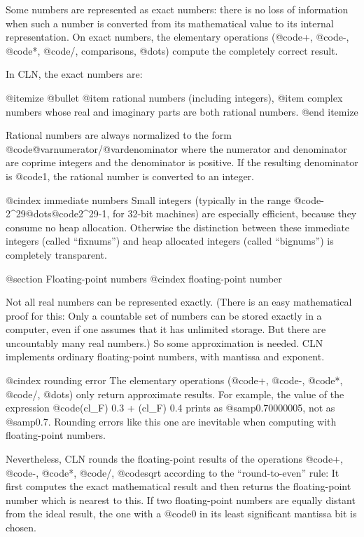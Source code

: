 Some numbers are represented as exact numbers: there is no loss of information
when such a number is converted from its mathematical value to its internal
representation. On exact numbers, the elementary operations (@code{+},
@code{-}, @code{*}, @code{/}, comparisons, @dots{}) compute the completely
correct result.

In CLN, the exact numbers are:

@itemize @bullet
@item
rational numbers (including integers),
@item
complex numbers whose real and imaginary parts are both rational numbers.
@end itemize

Rational numbers are always normalized to the form
@code{@var{numerator}/@var{denominator}} where the numerator and denominator
are coprime integers and the denominator is positive. If the resulting
denominator is @code{1}, the rational number is converted to an integer.

@cindex immediate numbers
Small integers (typically in the range @code{-2^29}@dots{}@code{2^29-1},
for 32-bit machines) are especially efficient, because they consume no heap
allocation. Otherwise the distinction between these immediate integers
(called ``fixnums'') and heap allocated integers (called ``bignums'')
is completely transparent.


@section Floating-point numbers
@cindex floating-point number

Not all real numbers can be represented exactly. (There is an easy mathematical
proof for this: Only a countable set of numbers can be stored exactly in
a computer, even if one assumes that it has unlimited storage. But there
are uncountably many real numbers.) So some approximation is needed.
CLN implements ordinary floating-point numbers, with mantissa and exponent.

@cindex rounding error
The elementary operations (@code{+}, @code{-}, @code{*}, @code{/}, @dots{})
only return approximate results. For example, the value of the expression
@code{(cl_F) 0.3 + (cl_F) 0.4} prints as @samp{0.70000005}, not as
@samp{0.7}. Rounding errors like this one are inevitable when computing
with floating-point numbers.

Nevertheless, CLN rounds the floating-point results of the operations @code{+},
@code{-}, @code{*}, @code{/}, @code{sqrt} according to the ``round-to-even''
rule: It first computes the exact mathematical result and then returns the
floating-point number which is nearest to this. If two floating-point numbers
are equally distant from the ideal result, the one with a @code{0} in its least
significant mantissa bit is chosen.

